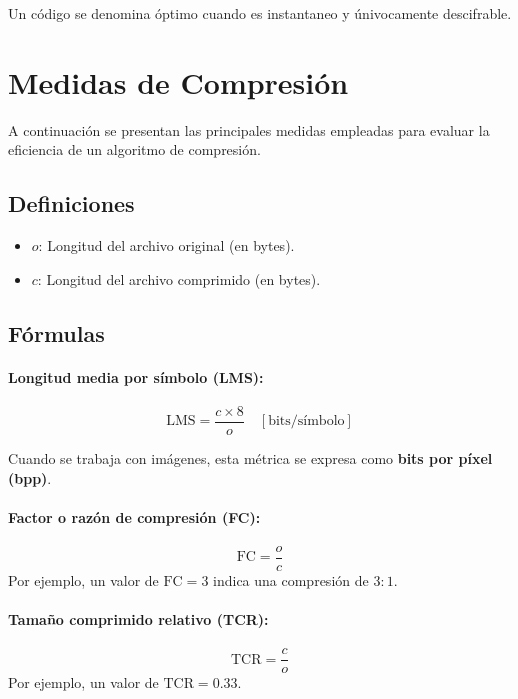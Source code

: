 \documentclass[11pt,a4paper]{article}
\begin{document}
\begin{NotaBox}
Un código se denomina óptimo cuando es instantaneo y únivocamente descifrable.
\end{NotaBox}

\section{Medidas de Compresión}

A continuación se presentan las principales medidas empleadas para evaluar la eficiencia de un algoritmo de compresión.

\subsection*{Definiciones}

\begin{itemize}
    \item $o$: Longitud del archivo original (en bytes).
    \item $c$: Longitud del archivo comprimido (en bytes).
\end{itemize}

\subsection*{Fórmulas}

\paragraph{Longitud media por símbolo (LMS):}
\begin{equation}
    \mathrm{LMS} = \frac{c \times 8}{o} \quad [\text{bits/símbolo}]
\end{equation}

Cuando se trabaja con imágenes, esta métrica se expresa como \textbf{bits por píxel (bpp)}.

\paragraph{Factor o razón de compresión (FC):}
\begin{equation}
    \mathrm{FC} = \frac{o}{c}
\end{equation}
Por ejemplo, un valor de $\mathrm{FC} = 3$ indica una compresión de $3\!:\!1$.

\paragraph{Tamaño comprimido relativo (TCR):}
\begin{equation}
    \mathrm{TCR} = \frac{c}{o}
\end{equation}
Por ejemplo, un valor de $\mathrm{TCR} = 0.33$.
\end{document}
